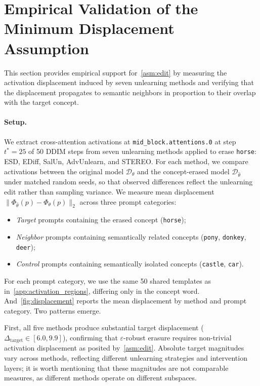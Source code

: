 \section{Empirical Validation of the Minimum Displacement Assumption}
\label{app:displacement}

This section provides empirical support for~\cref{asm:edit} by measuring the activation displacement induced by seven unlearning methods and verifying that the displacement propagates to semantic neighbors in proportion to their overlap with the target concept.

\paragraph{Setup.}
We extract cross-attention activations at \texttt{mid\_block.attentions.0} at step $t^*{=}25$ of 50 DDIM steps from seven unlearning methods applied to erase \texttt{horse}: ESD, EDiff, SalUn, AdvUnlearn, and STEREO. For each method, we compare activations between the original model $\mathcal{D}_\theta$ and the concept-erased model $\mathcal{D}_{\hat\theta}$ under matched random seeds, so that observed differences reflect the unlearning edit rather than sampling variance. We measure mean displacement $\|\Phi_{\hat\theta}(p) - \Phi_\theta(p)\|_2$ across three prompt categories:
\begin{itemize}
    \item \emph{Target} prompts containing the erased concept (\texttt{horse});
    \item \emph{Neighbor} prompts containing semantically related concepts (\texttt{pony}, \texttt{donkey}, \texttt{deer});
    \item \emph{Control} prompts containing semantically isolated concepts (\texttt{castle}, \texttt{car}).
\end{itemize}
For each prompt category, we use the same 50 shared templates as in~\cref{app:activation_regions}, differing only in the concept word. And~\cref{fig:displacement} reports the mean displacement by method and prompt category. Two patterns emerge.

First, all five methods produce substantial target displacement ($\Delta_{\mathrm{target}} \in [6.0, 9.9]$), confirming that $\varepsilon$-robust erasure requires non-trivial activation displacement as posited by~\cref{asm:edit}. Absolute target magnitudes vary across methods, reflecting different unlearning strategies and intervention layers; it is worth mentioning that these magnitudes are not comparable measures, as different methods operate on different subspaces.


